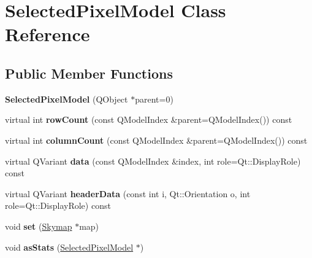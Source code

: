 \hypertarget{classSelectedPixelModel}{
\section{SelectedPixelModel Class Reference}
\label{classSelectedPixelModel}
}
\subsection*{Public Member Functions}
\begin{DoxyCompactItemize}
\item 
\hypertarget{classSelectedPixelModel_ab9c9ec40bdfcf9cf08de78eea949876d}{
{\bfseries SelectedPixelModel} (QObject $\ast$parent=0)}
\label{classSelectedPixelModel_ab9c9ec40bdfcf9cf08de78eea949876d}

\item 
\hypertarget{classSelectedPixelModel_a7c251c6c1fa73948f22d9157165aa3ec}{
virtual int {\bfseries rowCount} (const QModelIndex \&parent=QModelIndex()) const }
\label{classSelectedPixelModel_a7c251c6c1fa73948f22d9157165aa3ec}

\item 
\hypertarget{classSelectedPixelModel_a43b2a3e49a8cc6403a1e8f79c36edcf4}{
virtual int {\bfseries columnCount} (const QModelIndex \&parent=QModelIndex()) const }
\label{classSelectedPixelModel_a43b2a3e49a8cc6403a1e8f79c36edcf4}

\item 
\hypertarget{classSelectedPixelModel_a5c032b637803fc0e6a7c740c8dc81327}{
virtual QVariant {\bfseries data} (const QModelIndex \&index, int role=Qt::DisplayRole) const }
\label{classSelectedPixelModel_a5c032b637803fc0e6a7c740c8dc81327}

\item 
\hypertarget{classSelectedPixelModel_a22a416f6b042f199893a57384a6faf61}{
virtual QVariant {\bfseries headerData} (const int i, Qt::Orientation o, int role=Qt::DisplayRole) const }
\label{classSelectedPixelModel_a22a416f6b042f199893a57384a6faf61}

\item 
\hypertarget{classSelectedPixelModel_a7cd662c189072b73db370d7acca98dd5}{
void {\bfseries set} (\hyperlink{classSkymap}{Skymap} $\ast$map)}
\label{classSelectedPixelModel_a7cd662c189072b73db370d7acca98dd5}

\item 
\hypertarget{classSelectedPixelModel_ace4f6df4987fde3bcd26141d75ef0dc7}{
void {\bfseries asStats} (\hyperlink{classSelectedPixelModel}{SelectedPixelModel} $\ast$)}
\label{classSelectedPixelModel_ace4f6df4987fde3bcd26141d75ef0dc7}


\end{DoxyCompactItemize}
